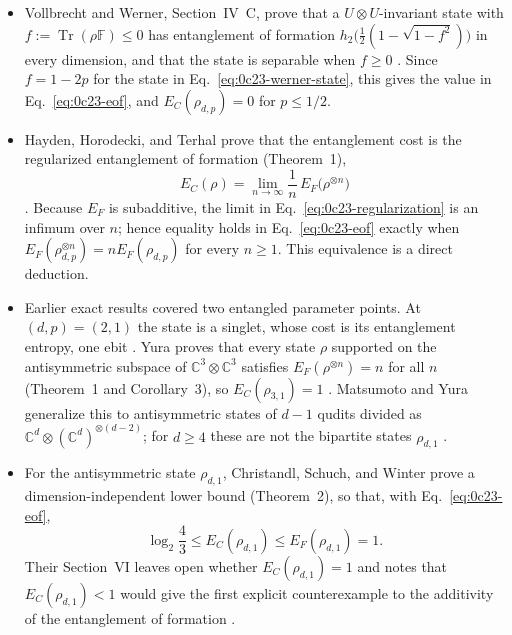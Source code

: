 \begin{itemize}
  \item Vollbrecht and Werner, Section~IV~C, prove that a $U\otimes U$-invariant
  state with $f:=\operatorname{Tr}(\rho\mathbb F)\leq0$ has entanglement of
  formation $h_2\bigl(\tfrac12(1-\sqrt{1-f^2})\bigr)$ in every dimension, and
  that the state is separable when $f\geq0$
  .  Since $f=1-2p$ for the state
  in Eq.~\eqref{eq:0c23-werner-state}, this gives the value in
  Eq.~\eqref{eq:0c23-eof}, and $E_C(\rho_{d,p})=0$ for $p\leq1/2$.

  \item Hayden, Horodecki, and Terhal prove that the entanglement cost is the
  regularized entanglement of formation (Theorem~1),
  \begin{equation}
    E_C(\rho)=\lim_{n\to\infty}\frac1n\,E_F\bigl(\rho^{\otimes n}\bigr)
    \label{eq:0c23-regularization}
  \end{equation}
  .  Because $E_F$ is
  subadditive, the limit in Eq.~\eqref{eq:0c23-regularization} is an infimum
  over $n$; hence equality holds in Eq.~\eqref{eq:0c23-eof} exactly when
  $E_F(\rho_{d,p}^{\otimes n})=nE_F(\rho_{d,p})$ for every $n\geq1$.  This
  equivalence is a direct deduction.

  \item Earlier exact results covered two entangled parameter points.  At $(d,p)=(2,1)$ the
  state is a singlet, whose cost is its entanglement entropy, one ebit
  .  Yura proves that every
  state $\rho$ supported on the antisymmetric subspace of
  $\mathbb C^3\otimes\mathbb C^3$ satisfies $E_F(\rho^{\otimes n})=n$ for all
  $n$ (Theorem~1 and Corollary~3), so $E_C(\rho_{3,1})=1$
  .  Matsumoto and Yura generalize this to
  antisymmetric states of $d-1$ qudits divided as
  $\mathbb C^d\otimes(\mathbb C^d)^{\otimes(d-2)}$; for $d\geq4$ these are not
  the bipartite states $\rho_{d,1}$
  .

  \item For the antisymmetric state $\rho_{d,1}$, Christandl, Schuch, and Winter
  prove a dimension-independent lower bound (Theorem~2), so that, with
  Eq.~\eqref{eq:0c23-eof},
  \begin{equation}
    \log_2\frac43\leq E_C(\rho_{d,1})\leq E_F(\rho_{d,1})=1 .
    \label{eq:0c23-antisymmetric}
  \end{equation}
  Their Section~VI leaves open whether $E_C(\rho_{d,1})=1$ and notes that
  $E_C(\rho_{d,1})<1$ would give the first explicit counterexample to the
  additivity of the entanglement of formation
  .


\end{itemize}
